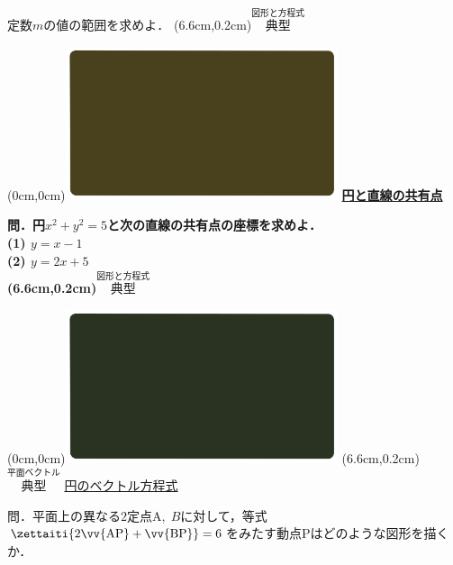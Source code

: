 \documentclass[10pt,
fleqn,
dvipdfmx,
uplatex
]{jsarticle}
\begin{document}
\large
\vspace{0.4zw}
\hfill 定数$m$の値の範囲を求めよ．
\at(6.6cm,0.2cm){\small\color{bradorange}$\overset{\text{図形と方程式}}{\text{典型}}$}

\newpage

\at(0cm,0cm){\includegraphics[width=8cm,bb=0 0 1920 1080]{./youtube/thumbnails/templates/smart_background/図形と方程式.jpeg}}
{\color{orange}\bf\boldmath\LARGE\underline{円と直線の共有点}}\vspace{0.3zw}

\Large 
\bf\boldmath 問．円$x^2+y^2=5$と次の直線の共有点の座標を求めよ．\\
(1)  $y=x-1$\\
(2)  $y=2x+5$\\

\at(6.6cm,0.2cm){\small\color{bradorange}$\overset{\text{図形と方程式}}{\text{典型}}$}

\newpage



\at(0cm,0cm){\includegraphics[width=8cm,bb=0 0 1920 1080]{./youtube/thumbnails/templates/smart_background/平面ベクトル.jpeg}}
\at(6.6cm,0.2cm){\small\color{bradorange}$\overset{\text{平面ベクトル}}{\text{典型}}$}
{\color{orange}\LARGE\underline{円のベクトル方程式}}\vspace{0.3zw}

\Large 
問．平面上の異なる$2$定点$\text{A},\;B$に対して，等式$\zettaiti{2\vv {\text{AP}}+\vv {\text{BP}}}=6$をみたす動点$\text{P}$はどのような図形を描くか．


\newpage
\end{document}
